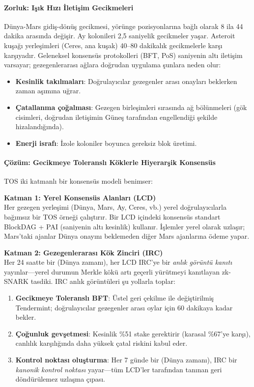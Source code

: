 \documentclass[11pt]{article}
\begin{document}
\paragraph{Zorluk: Işık Hızı İletişim Gecikmeleri}
Dünya-Mars gidiş-dönüş gecikmesi, yörünge pozisyonlarına bağlı olarak 8 ila 44 dakika arasında değişir. Ay kolonileri 2,5 saniyelik gecikmeler yaşar. Asteroit kuşağı yerleşimleri (Ceres, ana kuşak) 40--80 dakikalık gecikmelerle karşı karşıyadır. Geleneksel konsensüs protokolleri (BFT, PoS) saniyenin altı iletişim varsayar; gezegenlerarası ağlara doğrudan uygulama şunlara neden olur:
\begin{itemize}[noitemsep]
  \item \textbf{Kesinlik takılmaları}: Doğrulayıcılar gezegenler arası onayları beklerken zaman aşımına uğrar.
  \item \textbf{Çatallanma çoğalması}: Gezegen birleşimleri sırasında ağ bölünmeleri (gök cisimleri, doğrudan iletişimin Güneş tarafından engellendiği şekilde hizalandığında).
  \item \textbf{Enerji israfı}: İzole koloniler boyunca gereksiz blok üretimi.
\end{itemize}

\paragraph{Çözüm: Gecikmeye Toleranslı Köklerle Hiyerarşik Konsensüs}
TOS iki katmanlı bir konsensüs modeli benimser:

\textbf{Katman 1: Yerel Konsensüs Alanları (LCD)}\\
Her gezegen yerleşimi (Dünya, Mars, Ay, Ceres, vb.) yerel doğrulayıcılarla bağımsız bir TOS örneği çalıştırır. Bir LCD içindeki konsensüs standart BlockDAG + PAI (saniyenin altı kesinlik) kullanır. İşlemler yerel olarak uzlaşır; Mars'taki ajanlar Dünya onayını beklemeden diğer Mars ajanlarına ödeme yapar.

\textbf{Katman 2: Gezegenlerarası Kök Zinciri (IRC)}\\
Her 24 saatte bir (Dünya zamanı), her LCD IRC'ye bir \emph{anlık görüntü kanıtı} yayınlar—yerel durumun Merkle kökü artı geçerli yürütmeyi kanıtlayan zk-SNARK tasdiki. IRC anlık görüntüleri şu yollarla toplar:
\begin{enumerate}[noitemsep]
  \item \textbf{Gecikmeye Toleranslı BFT}: Üstel geri çekilme ile değiştirilmiş Tendermint; doğrulayıcılar gezegenler arası oylar için 60 dakikaya kadar bekler.
  \item \textbf{Çoğunluk gevşetmesi}: Kesinlik \%51 stake gerektirir (karasal \%67'ye karşı), canlılık karşılığında daha yüksek çatal riskini kabul eder.
  \item \textbf{Kontrol noktası oluşturma}: Her 7 günde bir (Dünya zamanı), IRC bir \emph{kanonik kontrol noktası} yayar—tüm LCD'ler tarafından tanınan geri döndürülemez uzlaşma çıpası.
\end{enumerate}
\end{document}
